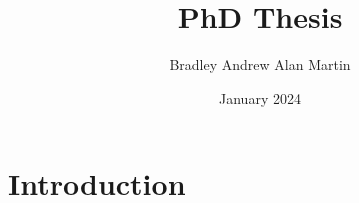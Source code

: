 \documentclass{article}
\title{PhD Thesis}
\author{Bradley Andrew Alan Martin}
\date{January 2024}
\begin{document}
\maketitle

\section{Introduction}
\end{document}
